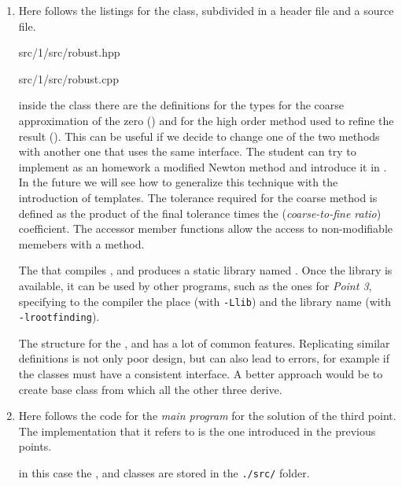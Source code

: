 \begin{enumerate}
    The notes for the  class are analogous to the ones for the
     class. Here follows the listings for this class
    \lstset{basicstyle=\scriptsize\sf}
    
    {src/1/src/newton.hpp}
    
    {src/1/src/newton.cpp}
    \lstset{basicstyle=\sf}


    \item Here follows the listings for the  class, subdivided in a
    header file and a source file.
    \lstset{basicstyle=\scriptsize\sf}
    
        {src/1/src/robust.hpp}
    
        {src/1/src/robust.cpp}
    \lstset{basicstyle=\sf}

    inside the  class there are the definitions for the types for
    the coarse approximation of the zero () and for the high order
    method used to refine the result (). This can be useful if we
    decide to change one of the two methods with another one that uses the same
    interface. The student can try to implement as an homework a modified
    Newton method and introduce it in . In the future we will see
    how to generalize this technique with the introduction of templates.
    The tolerance required for the coarse method is defined as the product of
    the final tolerance times the  (\emph{coarse-to-fine ratio})
    coefficient. The accessor member functions allow the access to
    non-modifiable memebers with a  method.

    The  that compiles ,  and
     produces a static library named . Once
    the library is available, it can be used by other programs, such as the ones
    for \emph{Point 3}, specifying to the compiler the place (with
    \texttt{-Llib}) and the library name (with \texttt{-lrootfinding}).

    The structure for the ,  and  has a
    lot of common features. Replicating similar definitions is not only poor
    design, but can also lead to errors, for example if the classes must have a
    consistent interface. A better approach would be to create
     base class from which all the other three derive.

    \item Here follows the code for the \emph{main program} for the solution of
    the third point. The implementation that it refers to is the one introduced
    in the previous points.
    \lstset{basicstyle=\scriptsize\sf}
    
    \lstset{basicstyle=\sf}
    in this case the ,  and  classes are
    stored in the \verb!./src/! folder.
    \lstset{basicstyle=\scriptsize\sf}
    
    \lstset{basicstyle=\sf}


\end{enumerate}
